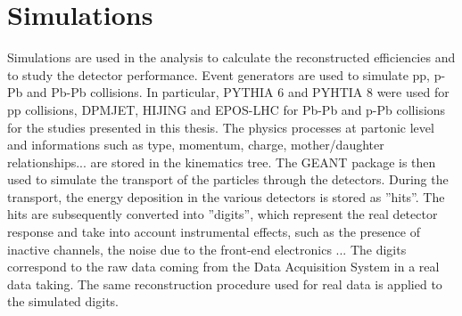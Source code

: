 \section{Simulations}
\label{sec:simu}
Simulations are used in the analysis to calculate the reconstructed efficiencies and to study the detector
performance.
Event generators are used to simulate pp, p-Pb and Pb-Pb collisions. In particular, PYTHIA 6 and
PYHTIA 8 were used for pp collisions, DPMJET, HIJING and EPOS-LHC for Pb-Pb and p-Pb collisions
for the studies presented in this thesis.
The physics processes at partonic level and informations such as type, momentum, 
charge, mother/daughter relationships... are stored in the kinematics tree. The GEANT package
is then used to simulate the transport of the particles through the
  detectors. During the transport, the energy deposition in the various detectors is stored 
  as ''hits''. The hits are subsequently converted into ''digits'', which represent 
  the real detector response and take into account instrumental effects, such as the presence of inactive channels, the noise 
  due to the front-end electronics ... The digits correspond to the raw data coming from the 
  Data Acquisition System in a real data taking. The same reconstruction procedure used for real data is applied to the simulated
  digits.

